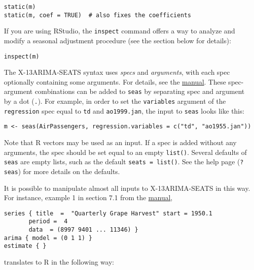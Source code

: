 \begin{verbatim}
static(m)
static(m, coef = TRUE)  # also fixes the coefficients
\end{verbatim}

If you are using RStudio, the \texttt{inspect} command offers a way to
analyze and modify a seasonal adjustment procedure (see the section
below for details):

\begin{verbatim}
inspect(m)
\end{verbatim}


The X-13ARIMA-SEATS syntax uses \emph{specs} and \emph{arguments}, with
each spec optionally containing some arguments. For details, see the
\href{http://www.census.gov/ts/x13as/docX13AS.pdf}{manual}. These
spec-argument combinations can be added to \texttt{seas} by separating
spec and argument by a dot (\texttt{.}). For example, in order to set
the \texttt{variables} argument of the \texttt{regression} spec equal to
\texttt{td} and \texttt{ao1999.jan}, the input to \texttt{seas} looks
like this:

\begin{verbatim}
m <- seas(AirPassengers, regression.variables = c("td", "ao1955.jan"))
\end{verbatim}

Note that R vectors may be used as an input. If a spec is added without
any arguments, the spec should be set equal to an empty \texttt{list()}.
Several defaults of \texttt{seas} are empty lists, such as the default
\texttt{seats = list()}. See the help page (\texttt{?seas}) for more
details on the defaults.

It is possible to manipulate almost all inputs to X-13ARIMA-SEATS in
this way. For instance, example 1 in section 7.1 from the
\href{http://www.census.gov/ts/x13as/docX13AS.pdf}{manual},

\begin{verbatim}
series { title  =  "Quarterly Grape Harvest" start = 1950.1
       period =  4
       data  = (8997 9401 ... 11346) }
arima { model = (0 1 1) }
estimate { }
\end{verbatim}

translates to R in the following way:

